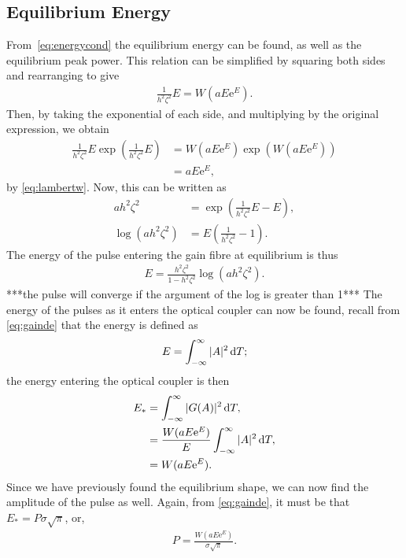 \subsection{Equilibrium Energy}
From~\eqref{eq:energycond} the equilibrium energy can be found, as well as the equilibrium peak power. This relation can be simplified by squaring both sides and rearranging to give
\begin{align*}
\frac{1}{h^2 \zeta^2} E = W \left( a E \textrm{e}^E \right).
\end{align*}
Then, by taking the exponential of each side, and multiplying by the original expression, we obtain
\begin{align*}
\frac{1}{h^2 \zeta^2} E \exp \left(\frac{1}{h^2 \zeta^2} E \right) &= W \left( a E \textrm{e}^E \right) \exp \left( W \left( a E \textrm{e}^E \right) \right) \\
&= a E \textrm{e}^E,
\end{align*}
by \eqref{eq:lambertw}. Now, this can be written as 
\begin{align*}
a h^2 \zeta^2 &= \exp \left( \frac{1}{h^2 \zeta^2}E - E \right), \\
\log \left( a h^2 \zeta^2 \right) &= E \left( \frac{1}{h^2 \zeta^2} - 1 \right).
\end{align*}
The energy of the pulse entering the gain fibre at equilibrium is thus
\begin{align*}
E = \frac{h^2 \zeta^2}{1 - h^2 \zeta^2} \log \left( a h^2 \zeta^2 \right).
\end{align*}
***the pulse will converge if the argument of the log is greater than 1***
The energy of the pulses as it enters the optical coupler can now be found, recall from \eqref{eq:gainde} that the energy is defined as
\begin{align*}
E = \int_{-\infty}^\infty |A|^2 \, \textrm{d} T;
\end{align*}
the energy entering the optical coupler is then
\begin{align}
\nonumber E_* &= \int_{-\infty}^\infty |G(A)|^2 \, \textrm{d} T, \\
\nonumber &= \frac{W(a E \textrm{e}^E)}{E} \int_{-\infty}^\infty |A|^2 \, \textrm{d} T, \\
&= W(a E \textrm{e}^E).
\end{align}
Since we have previously found the equilibrium shape, we can now find the amplitude of the pulse as well. Again, from \eqref{eq:gainde}, it must be that $E_* = P \sigma \sqrt{\pi}$, or,
\begin{align}
P = \frac{W(a E \textrm{e}^E)}{\sigma \sqrt{\pi}}.
\end{align}
